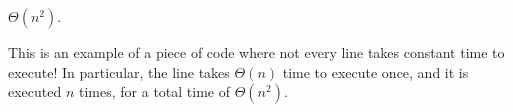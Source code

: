 \begin{prob}
\begin{subprobset}
        \begin{subprob}
            \inputminted{python}{\thisdir/include/part_d.py}

            \begin{soln}
                $\Theta(n^2)$.

                This is an example of a piece of code where not every line
                takes constant time to execute! In particular, the  line
                takes $\Theta(n)$ time to execute once, and it is executed $n$ times, for
                a total time of $\Theta(n^2)$.
            \end{soln}
        \end{subprob}

    \end{subprobset}
    
\end{prob}

